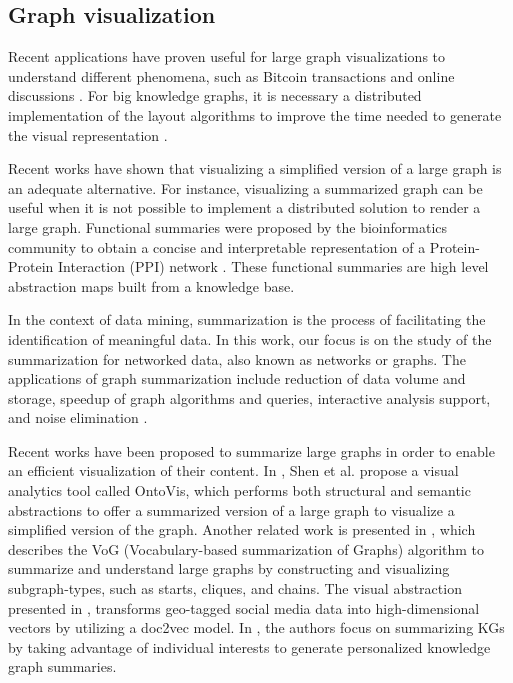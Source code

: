 \documentclass{ieeeaccess}
\begin{document}
\subsection{Graph visualization}

Recent applications have
proven useful for large graph visualizations to understand
different phenomena, such as Bitcoin transactions 
\cite{mcginn2016visualizing} and online discussions
\cite{molina2017improving}. For big knowledge graphs, it is necessary a
distributed implementation of the layout algorithms to improve the time 
needed to generate the visual representation \cite{gomez2018visualizing}. 

Recent works \cite{6787141,1703364,8801911} have shown that visualizing a 
simplified version of a large graph is an adequate alternative. For instance, \cite{Tasnim2020} 
visualizing a summarized graph can be useful when it is not possible to 
implement a distributed solution to render a large graph. Functional
summaries were proposed by the bioinformatics community to obtain a 
concise and interpretable representation of a Protein-Protein Interaction (PPI)
network \cite{Seah12}. These functional summaries are high level abstraction
maps built from a knowledge base.


In the context of data mining, summarization is the process of facilitating 
the identification of meaningful data. In this work, our focus is on the
study of the summarization for networked data, also known as networks or
graphs. The applications of graph summarization include reduction of data
volume and storage, speedup of graph algorithms and queries, interactive
analysis support, and noise elimination \cite{liu2018graph}. 


Recent works have been proposed to summarize large graphs in order to enable an efficient 
visualization of their content. In \cite{OntoVis}, Shen et al. propose a visual 
analytics tool called OntoVis, which performs both structural and semantic abstractions to offer
a summarized version of a large graph to visualize a simplified version of the graph. Another
related work is presented in \cite{koutra2014vog}, which describes the VoG (Vocabulary-based
summarization of Graphs) algorithm to summarize and understand large graphs by constructing
and visualizing subgraph-types, such as starts, cliques, and chains. The visual abstraction
presented in \cite{8801911}, transforms geo-tagged social media data into high-dimensional
vectors by utilizing a doc2vec model. In \cite{Koutra2019}, the authors focus on 
summarizing KGs by taking advantage of individual interests to generate personalized
knowledge graph summaries.
\end{document}

